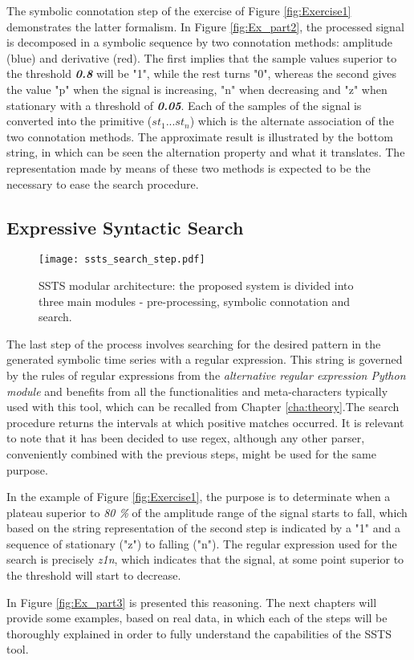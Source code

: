 The symbolic connotation step of the exercise of Figure \ref{fig:Exercise1} demonstrates the latter formalism. In Figure \ref{fig:Ex_part2}, the processed signal is decomposed in a symbolic sequence by two connotation methods: amplitude (blue) and derivative (red). The first implies that the sample values superior to the threshold \textit{\textbf{0.8}} will be "1", while the rest turns "0", whereas the second gives the value "p" when the signal is increasing, "n" when decreasing and "z" when stationary with a threshold of \textit{\textbf{0.05}}. Each of the samples of the signal is converted into the primitive ($st_1...st_n$) which is the alternate association of the two connotation methods. The approximate result is illustrated by the bottom string, in which can be seen the alternation property and what it translates. The representation made by means of these two methods is expected to be the necessary to ease the search procedure.

\subsection{Expressive Syntactic Search}

\begin{figure}
\centering
\texttt{[image: ssts\_search\_step.pdf]}
\label{fig:ssts_intro}
\caption{SSTS modular architecture: the proposed system is divided into three main modules - pre-processing, symbolic connotation and search.}
\end{figure}

The last step of the process involves searching for the desired pattern in the generated symbolic time series with a regular expression. This string is governed by the rules of regular expressions from the \textit{alternative regular expression Python module} \cite{rgxPy} and benefits from all the functionalities and meta-characters typically used with this tool, which can be recalled from Chapter \ref{cha:theory}.The search procedure returns the intervals at which positive matches occurred. It is relevant to note that it has been decided to use \gls{regex}, although any other parser, conveniently combined with the previous steps, might be used for the same purpose.
\par
In the example of Figure \ref{fig:Exercise1}, the purpose is to determinate when a plateau superior to \textit{80 \%} of the amplitude range of the signal starts to fall, which based on the string representation of the second step is indicated by a "1" and a sequence of stationary ("z") to falling ("n"). The regular expression used for the search is precisely \textit{z1n}, which indicates that the signal, at some point superior to the threshold will start to decrease. 
\par
In Figure \ref{fig:Ex_part3} is presented this reasoning.
The next chapters will provide some examples, based on real data, in which each of the steps will be thoroughly explained in order to fully understand the capabilities of the \gls{SSTS} tool.









